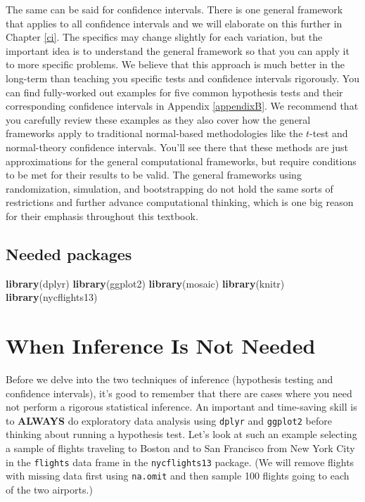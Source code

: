 \documentclass[]{tufte-book}
\newenvironment{Shaded}{\begin{snugshade}}{\end{snugshade}}
\newcommand{\KeywordTok}[1]{\textcolor[rgb]{0.13,0.29,0.53}{\textbf{{#1}}}}
\newcommand{\NormalTok}[1]{{#1}}
\begin{document}
The same can be said for confidence intervals. There is one general
framework that applies to all confidence intervals and we will elaborate
on this further in Chapter \ref{ci}. The specifics may change slightly
for each variation, but the important idea is to understand the general
framework so that you can apply it to more specific problems. We believe
that this approach is much better in the long-term than teaching you
specific tests and confidence intervals rigorously. You can find
fully-worked out examples for five common hypothesis tests and their
corresponding confidence intervals in Appendix \ref{appendixB}. We
recommend that you carefully review these examples as they also cover
how the general frameworks apply to traditional normal-based
methodologies like the \(t\)-test and normal-theory confidence
intervals. You'll see there that these methods are just approximations
for the general computational frameworks, but require conditions to be
met for their results to be valid. The general frameworks using
randomization, simulation, and bootstrapping do not hold the same sorts
of restrictions and further advance computational thinking, which is one
big reason for their emphasis throughout this textbook.

\subsection*{Needed packages}\label{needed-packages-4}

\begin{Shaded}
\begin{Highlighting}[]
\KeywordTok{library}\NormalTok{(dplyr)}
\KeywordTok{library}\NormalTok{(ggplot2)}
\KeywordTok{library}\NormalTok{(mosaic)}
\KeywordTok{library}\NormalTok{(knitr)}
\KeywordTok{library}\NormalTok{(nycflights13)}
\end{Highlighting}
\end{Shaded}

\section{When Inference Is Not
Needed}\label{when-inference-is-not-needed}

Before we delve into the two techniques of inference (hypothesis testing
and confidence intervals), it's good to remember that there are cases
where you need not perform a rigorous statistical inference. An
important and time-saving skill is to \textbf{ALWAYS} do exploratory
data analysis using \texttt{dplyr} and \texttt{ggplot2} before thinking
about running a hypothesis test. Let's look at such an example selecting
a sample of flights traveling to Boston and to San Francisco from New
York City in the \texttt{flights} data frame in the
\texttt{nycflights13} package. (We will remove flights with missing data
first using \texttt{na.omit} and then sample 100 flights going to each
of the two airports.)
\end{document}
